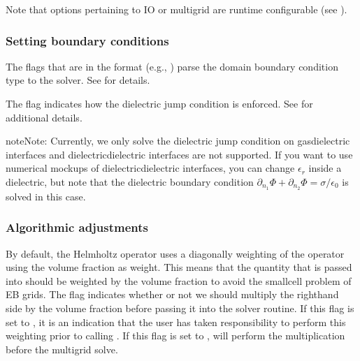 \documentclass[letterpaper,10pt,english]{sphinxmanual}
\begin{document}
Note that  options pertaining to IO or multigrid are run\sphinxhyphen{}time configurable (see {\hyperref[\detokenize{Base/Control:chap-runtimeconfig}]{}}).


\subsubsection{Setting boundary conditions}
\label{\detokenize{Solvers/Electrostatics:setting-boundary-conditions}}
The flags that are in the format  (e.g., ) parse the domain boundary condition type to the solver.
See {\hyperref[\detokenize{Solvers/Electrostatics:chap-poissondomainbc}]{}} for details.

The flag  indicates how the dielectric jump condition is enforced.
See {\hyperref[\detokenize{Solvers/Electrostatics:chap-poissondielectricbc}]{}} for additional details.

\begin{sphinxadmonition}{note}{Note:}
Currently, we only solve the dielectric jump condition on gas\sphinxhyphen{}dielectric interfaces and dielectric\sphinxhyphen{}dielectric interfaces are not supported.
If you want to use numerical mock\sphinxhyphen{}ups of dielectric\sphinxhyphen{}dielectric interfaces, you can change \(\epsilon_r\) inside a dielectric, but note that the dielectric boundary condition \(\partial_{n_1}\Phi + \partial_{n_2}\Phi = \sigma/\epsilon_0\) is  solved in this case.
\end{sphinxadmonition}


\subsubsection{Algorithmic adjustments}
\label{\detokenize{Solvers/Electrostatics:algorithmic-adjustments}}
By default, the Helmholtz operator uses a diagonally weighting of the operator using the volume fraction as weight.
This means that the quantity that is passed into  should be weighted by the volume fraction to avoid the small\sphinxhyphen{}cell problem of EB grids.
The flag  indicates whether or not we should multiply the right\sphinxhyphen{}hand side by the volume fraction before passing it into the solver routine.
If this flag is set to , it is an indication that the user has taken responsibility to perform this weighting prior to calling .
If this flag is set to ,  will perform the multiplication before the multigrid solve.
\end{document}
